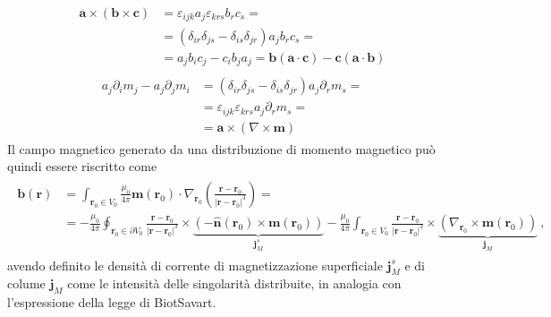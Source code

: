 \documentclass[letterpaper,10pt,italian]{jupyterBook}
\begin{document}
\begin{equation*}
\begin{split}\begin{aligned}
  \mathbf{a} \times (\mathbf{b} \times \mathbf{c}) & = \varepsilon_{ijk} a_j \varepsilon_{krs} b_r c_s = \\
  & = (\delta_{ir} \delta_{js} - \delta_{is} \delta_{jr}) a_j b_r c_s = \\
  & = a_j b_i c_j - c_i b_j a_j = \mathbf{b}(\mathbf{a} \cdot \mathbf{c}) - \mathbf{c} (\mathbf{a} \cdot \mathbf{b})
\end{aligned}\end{split}
\end{equation*}\begin{equation*}
\begin{split}\begin{aligned}
 a_j \partial_i m_j - a_j \partial_j m_i
 & = (\delta_{ir} \delta_{js} - \delta_{is} \delta_{jr}) a_j \partial_r m_s = \\
 & = \varepsilon_{ijk} \varepsilon_{krs} a_j \partial_r m_s = \\
 & = \mathbf{a} \times \left( \nabla \times \mathbf{m} \right)
\end{aligned}\end{split}
\end{equation*}
\sphinxAtStartPar
Il campo magnetico generato da una distribuzione di momento magnetico può quindi essere riscritto come
\begin{equation*}
\begin{split}\begin{aligned}
\mathbf{b}(\mathbf{r})
  & = \int_{\mathbf{r}_0 \in V_0} \frac{\mu_0}{4 \pi } \mathbf{m}(\mathbf{r}_0) \cdot \nabla_{\mathbf{r}_0}  \left( \frac{\mathbf{r} - \mathbf{r}_0}{|\mathbf{r} - \mathbf{r}_0|^3} \right) = \\
  & = - \frac{\mu_0}{4\pi} \oint_{\mathbf{r}_0 \in \partial V_0} \frac{\mathbf{r} - \mathbf{r}_0}{|\mathbf{r} - \mathbf{r}_0|^3} \times \underbrace{ \left( - \hat{\mathbf{n}}(\mathbf{r}_0) \times \mathbf{m}(\mathbf{r}_0) \right) }_{\mathbf{j}^s_M}
  - \frac{\mu_0}{4 \pi} \int_{\mathbf{r}_0 \in V_0} \frac{\mathbf{r} - \mathbf{r}_0}{|\mathbf{r}-\mathbf{r}_0|^3} \times \underbrace{ \left(\nabla_{\mathbf{r}_0} \times \mathbf{m}(\mathbf{r}_0) \right)}_{\mathbf{j}_M} \ ,
\end{aligned}\end{split}
\end{equation*}
\sphinxAtStartPar
avendo definito le densità di corrente di magnetizzazione superficiale \(\mathbf{j}^s_M\) e di colume \(\mathbf{j}_M\) come le intensità delle singolarità distribuite, in analogia con l’espressione della legge di Biot\sphinxhyphen{}Savart.
\end{document}
